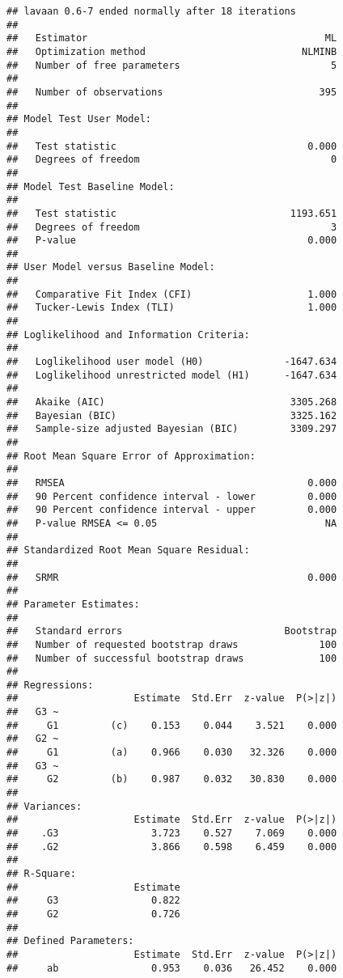\documentclass[
]{article}
\begin{document}
\begin{verbatim}
## lavaan 0.6-7 ended normally after 18 iterations
## 
##   Estimator                                         ML
##   Optimization method                           NLMINB
##   Number of free parameters                          5
##                                                       
##   Number of observations                           395
##                                                       
## Model Test User Model:
##                                                       
##   Test statistic                                 0.000
##   Degrees of freedom                                 0
## 
## Model Test Baseline Model:
## 
##   Test statistic                              1193.651
##   Degrees of freedom                                 3
##   P-value                                        0.000
## 
## User Model versus Baseline Model:
## 
##   Comparative Fit Index (CFI)                    1.000
##   Tucker-Lewis Index (TLI)                       1.000
## 
## Loglikelihood and Information Criteria:
## 
##   Loglikelihood user model (H0)              -1647.634
##   Loglikelihood unrestricted model (H1)      -1647.634
##                                                       
##   Akaike (AIC)                                3305.268
##   Bayesian (BIC)                              3325.162
##   Sample-size adjusted Bayesian (BIC)         3309.297
## 
## Root Mean Square Error of Approximation:
## 
##   RMSEA                                          0.000
##   90 Percent confidence interval - lower         0.000
##   90 Percent confidence interval - upper         0.000
##   P-value RMSEA <= 0.05                             NA
## 
## Standardized Root Mean Square Residual:
## 
##   SRMR                                           0.000
## 
## Parameter Estimates:
## 
##   Standard errors                            Bootstrap
##   Number of requested bootstrap draws              100
##   Number of successful bootstrap draws             100
## 
## Regressions:
##                    Estimate  Std.Err  z-value  P(>|z|)
##   G3 ~                                                
##     G1         (c)    0.153    0.044    3.521    0.000
##   G2 ~                                                
##     G1         (a)    0.966    0.030   32.326    0.000
##   G3 ~                                                
##     G2         (b)    0.987    0.032   30.830    0.000
## 
## Variances:
##                    Estimate  Std.Err  z-value  P(>|z|)
##    .G3                3.723    0.527    7.069    0.000
##    .G2                3.866    0.598    6.459    0.000
## 
## R-Square:
##                    Estimate
##     G3                0.822
##     G2                0.726
## 
## Defined Parameters:
##                    Estimate  Std.Err  z-value  P(>|z|)
##     ab                0.953    0.036   26.452    0.000
\end{verbatim}
\end{document}
